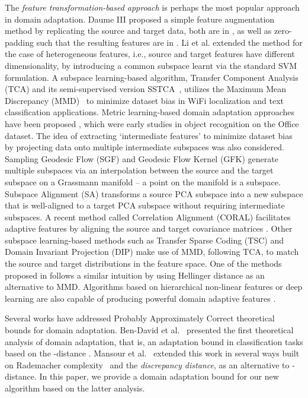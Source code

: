 \documentclass[10pt,journal,compsoc]{IEEEtran}
\begin{document}
The \emph{feature transformation-based approach} is perhaps the most popular approach in domain adaptation.
Daume III \cite{Daume-III:2007aa} proposed a simple feature augmentation method by replicating the source and target data, both are in , as well as zero-padding such that the resulting features are in . 
Li et al. \cite{Li_HFA:TPAMI2014} extended the method for the case of heterogeneous features, i.e., source and target features have different dimensionality, by introducing a common subspace learnt via the standard SVM formulation.
A subspace learning-based algorithm, Transfer Component Analysis (TCA) and its semi-supervised version SSTCA~\cite{Pan2011}, utilizes the Maximum Mean Discrepancy (MMD)~\cite{Gretton:2007aa} to minimize dataset bias in WiFi localization and text classification applications.
Metric learning-based domain adaptation approaches have been proposed \cite{Saenko:2010aa, Kulis:2011aa}, which were early studies in object recognition on the Office dataset.
The idea of extracting `intermediate features' to minimize dataset bias by projecting data onto multiple intermediate subspaces was also considered.
Sampling Geodesic Flow (SGF) \cite{Gopalan:2011aa} and Geodesic Flow Kernel (GFK) \cite{Gong:2012aa} generate multiple subspaces via an interpolation between the source and the target subspace on a Grassmann manifold -- a point on the manifold is a subspace.
Subspace Alignment (SA) \cite{Fernando:2013aa} transforms a source PCA subspace into a new subspace that is well-aligned to a target PCA subspace without requiring intermediate subspaces.
A recent method called Correlation Alignment (CORAL) facilitates adaptive features by aligning the source and target covariance matrices \cite{Sun:AAAI2016}.
Other subspace learning-based methods such as Transfer Sparse Coding (TSC) \cite{Long:2013aa} and Domain Invariant Projection (DIP) \cite{Baktashmotlagh:2013} make use of MMD, following TCA, to match the source and target distributions in the feature space.
One of the methods proposed in \cite{Baktashmotlagh:2014} follows a similar intuition by using Hellinger distance as an alternative to MMD.
Algorithms based on hierarchical non-linear features or deep learning are also capable of producing powerful domain adaptive features 
\cite{Chopra:2013aa,Donahue:2014aa,Ganin2015,Ghifary2014b,Hoffman:2013aa,Long_DAN:2015}.


Several works have addressed Probably Approximately Correct theoretical bounds for domain adaptation.
Ben-David et al.~\cite{Ben-David:2007aa} presented the first theoretical analysis of domain adaptation, that is, an adaptation bound in classification tasks based on the -distance \cite{Kifer:2004}.
Mansour et al.~\cite{Mansour2009} extended this work in several ways built on Rademacher complexity~\cite{Bartlett:2002} and the \emph{discrepancy distance}, as an alternative to -distance.
In this paper, we provide a domain adaptation bound for our new algorithm based on the latter analysis.
\end{document}
